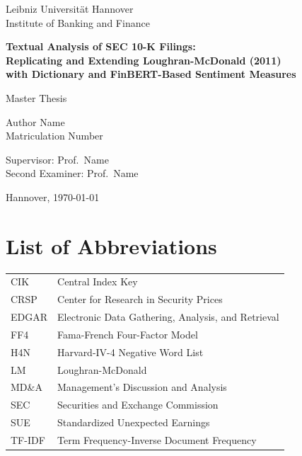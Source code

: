 \documentclass[12pt,a4paper,oneside]{report}
\begin{document}

\begin{titlepage}
\centering
\vspace*{2cm}
{\Large Leibniz Universit\"at Hannover\\Institute of Banking and Finance\par}
\vspace{2cm}
{\LARGE\bfseries Textual Analysis of SEC 10-K Filings:\\
Replicating and Extending Loughran-McDonald (2011)\\
with Dictionary and FinBERT-Based Sentiment Measures\par}
\vspace{2cm}
{\large Master Thesis\par}
\vspace{1cm}
{\large Author Name\\Matriculation Number\par}
\vspace{1cm}
{\large Supervisor: Prof.\ Name\\Second Examiner: Prof.\ Name\par}
\vspace{1cm}
{\large Hannover, \today\par}
\end{titlepage}

\tableofcontents
\newpage
\listoffigures
\newpage
\listoftables
\newpage

\chapter*{List of Abbreviations}
\begin{tabular}{ll}
CIK    & Central Index Key \\
CRSP   & Center for Research in Security Prices \\
EDGAR  & Electronic Data Gathering, Analysis, and Retrieval \\
FF4    & Fama-French Four-Factor Model \\
H4N    & Harvard-IV-4 Negative Word List \\
LM     & Loughran-McDonald \\
MD\&A  & Management's Discussion and Analysis \\
SEC    & Securities and Exchange Commission \\
SUE    & Standardized Unexpected Earnings \\
TF-IDF & Term Frequency-Inverse Document Frequency \\
\end{tabular}
\newpage
\end{document}
